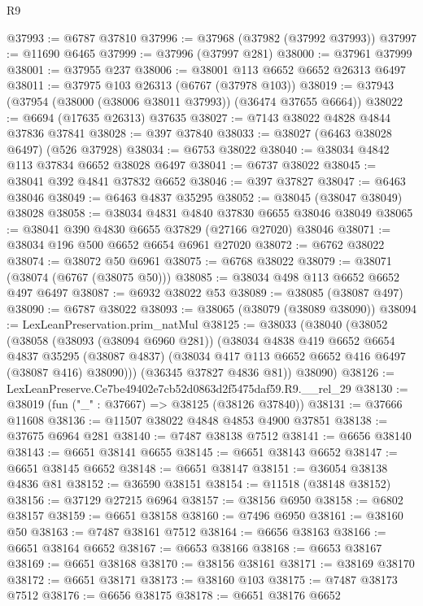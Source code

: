 \begin{lexlean}{R9}
\begin{coremodule}
@37993 := @6787 @37810
@37996 := @37968 (@37982 (@37992 @37993))
@37997 := @11690 @6465
@37999 := @37996 (@37997 @281)
@38000 := @37961 @37999
@38001 := @37955 @237
@38006 := @38001 @113 @6652 @6652 @26313 @6497
@38011 := @37975 @103 @26313 (@6767 (@37978 @103))
@38019 := @37943 (@37954 (@38000 (@38006 @38011 @37993)) (@36474 @37655 @6664))
@38022 := @6694 (@17635 @26313) @37635
@38027 := @7143 @38022 @4828 @4844 @37836 @37841
@38028 := @397 @37840
@38033 := @38027 (@6463 @38028 @6497) (@526 @37928)
@38034 := @6753 @38022
@38040 := @38034 @4842 @113 @37834 @6652 @38028 @6497
@38041 := @6737 @38022
@38045 := @38041 @392 @4841 @37832 @6652
@38046 := @397 @37827
@38047 := @6463 @38046
@38049 := @6463 @4837 @35295
@38052 := @38045 (@38047 @38049) @38028
@38058 := @38034 @4831 @4840 @37830 @6655 @38046 @38049
@38065 := @38041 @390 @4830 @6655 @37829 (@27166 @27020) @38046
@38071 := @38034 @196 @500 @6652 @6654 @6961 @27020
@38072 := @6762 @38022
@38074 := @38072 @50 @6961
@38075 := @6768 @38022
@38079 := @38071 (@38074 (@6767 (@38075 @50)))
@38085 := @38034 @498 @113 @6652 @6652 @497 @6497
@38087 := @6932 @38022 @53
@38089 := @38085 (@38087 @497)
@38090 := @6787 @38022
@38093 := @38065 (@38079 (@38089 @38090))
@38094 := LexLeanPreservation.prim_natMul
@38125 := @38033
    (@38040
      (@38052
        (@38058
          (@38093 (@38094 @6960 @281))
          (@38034
            @4838
            @419
            @6652
            @6654
            @4837
            @35295
            (@38087 @4837)
            (@38034 @417 @113 @6652 @6652 @416 @6497 (@38087 @416) @38090)))
        (@36345 @37827 @4836 @81))
      @38090)
@38126 := LexLeanPreserve.Ce7be49402e7cb52d0863d2f5475daf59.R9.__rel_29
@38130 := @38019 (fun ("_" : @37667) => @38125 (@38126 @37840))
@38131 := @37666 @11608
@38136 := @11507 @38022 @4848 @4853 @4900 @37851
@38138 := @37675 @6964 @281
@38140 := @7487 @38138 @7512
@38141 := @6656 @38140
@38143 := @6651 @38141 @6655
@38145 := @6651 @38143 @6652
@38147 := @6651 @38145 @6652
@38148 := @6651 @38147
@38151 := @36054 @38138 @4836 @81
@38152 := @36590 @38151
@38154 := @11518 (@38148 @38152)
@38156 := @37129 @27215 @6964
@38157 := @38156 @6950
@38158 := @6802 @38157
@38159 := @6651 @38158
@38160 := @7496 @6950
@38161 := @38160 @50
@38163 := @7487 @38161 @7512
@38164 := @6656 @38163
@38166 := @6651 @38164 @6652
@38167 := @6653 @38166
@38168 := @6653 @38167
@38169 := @6651 @38168
@38170 := @38156 @38161
@38171 := @38169 @38170
@38172 := @6651 @38171
@38173 := @38160 @103
@38175 := @7487 @38173 @7512
@38176 := @6656 @38175
@38178 := @6651 @38176 @6652

\end{coremodule}
\end{lexlean}
